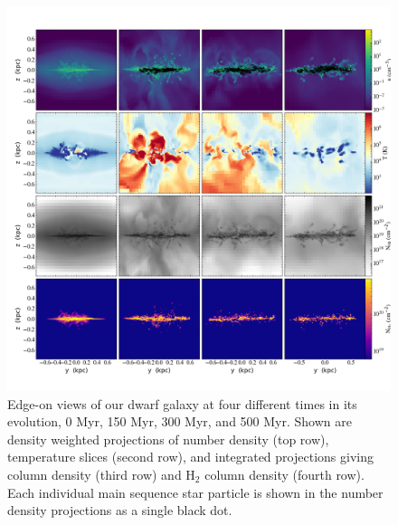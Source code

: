 \documentclass[twocolumn]{aastex61}
\begin{document}
\begin{figure}
\centering
\includegraphics[width=0.975\linewidth]{multiplot_4x4_x.png}
\caption{Edge-on views of our dwarf galaxy at four different times in its evolution, 0 Myr, 150 Myr, 300 Myr, and 500 Myr. Shown are density weighted projections of number density (top row), temperature slices (second row), and integrated projections giving  column density (third row) and H$_2$ column density (fourth row). Each individual main sequence star particle is shown in the number density projections as a single black dot.}
\label{fig:panel_x}
\end{figure}
\end{document}
